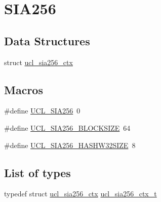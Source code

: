 \hypertarget{group___u_c_l___s_i_a256}{}\section{S\+I\+A256}
\label{group___u_c_l___s_i_a256}
\subsection*{Data Structures}
\begin{DoxyCompactItemize}
\item
struct \hyperlink{group___u_c_l___s_i_a256_structucl__sia256__ctx}{ucl\+\_\+sia256\+\_\+ctx}
\end{DoxyCompactItemize}
\subsection*{Macros}
\begin{DoxyCompactItemize}
\item
\#define \hyperlink{group___u_c_l___s_i_a256_gaea9532ac144a90f3ee34ae129ed68282}{U\+C\+L\+\_\+\+S\+I\+A256}~0
\item
\#define \hyperlink{group___u_c_l___s_i_a256_ga34283058845b7379a0d481372e2ad4d9}{U\+C\+L\+\_\+\+S\+I\+A256\+\_\+\+B\+L\+O\+C\+K\+S\+I\+ZE}~64
\item
\#define \hyperlink{group___u_c_l___s_i_a256_gafaca6ff0632649a744923a29c7d197f1}{U\+C\+L\+\_\+\+S\+I\+A256\+\_\+\+H\+A\+S\+H\+W32\+S\+I\+ZE}~8
\end{DoxyCompactItemize}
\subsection*{List of types}
\begin{DoxyCompactItemize}
\item
typedef struct \hyperlink{group___u_c_l___s_i_a256_structucl__sia256__ctx}{ucl\+\_\+sia256\+\_\+ctx} \hyperlink{group___u_c_l___s_i_a256_ga17e23ec55cac2194659d2b08c2a3f4ca}{ucl\+\_\+sia256\+\_\+ctx\+\_\+t}
\end{DoxyCompactItemize}
